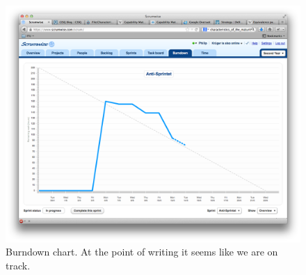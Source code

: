 \begin{figure}[H]
  \centering
  \includegraphics[width=\textwidth]{illustrations/burndown}
  \caption{Burndown chart. At the point of writing it seems like we are on track.}
  \label{burndown}
\end{figure}

